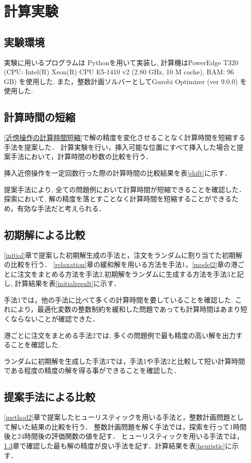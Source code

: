 \chapter{計算実験}\label{computational_result}
\section{実験環境}
実験に用いるプログラムは Pythonを用いて実装し, 計算機はPowerEdge T320 (CPU: Intel(R) Xeon(R) CPU E5-1410 v2 (2.80 GHz, 10 M cache), RAM: 96 GB) を使用した. また，整数計画ソルバーとしてGurobi Optimizer (ver 9.0.0) を使用した.

\section{計算時間の短縮}
\label{timecomparision}
\ref{近傍操作の計算時間短縮}で解の精度を変化させることなく計算時間を短縮する手法を提案した．
計算実験を行い，挿入可能な位置にすべて挿入した場合と提案手法において，計算時間の秒数の比較を行う．

挿入近傍操作を一定回数行った際の計算時間の比較結果を表\ref{shift}に示す．

提案手法により, 全ての問題例において計算時間が短縮できることを確認した．探索において, 解の精度を落とすことなく計算時間を短縮することができるため，有効な手法だと考えられる．

\section{初期解による比較}
\label{sectioninitial}
\ref{initial}章で提案した初期解生成の手法と，注文をランダムに割り当てた初期解の比較を行う．
\ref{relaxation}章の緩和解を用いる方法を手法1，\ref{model2}章の港ごとに注文をまとめる方法を手法2,初期解をランダムに生成する方法を手法3と記し, 計算結果を表\ref{initialresult}に示す．

手法1では，他の手法に比べて多くの計算時間を要していることを確認した. これにより，最適化変数の整数制約を緩和した問題であっても計算時間はあまり短くならないことが確認できた．

港ごとに注文をまとめる手法2では, 多くの問題例で最も精度の高い解を出力することを確認した.

ランダムに初期解を生成した手法3では，手法1や手法2と比較して短い計算時間である程度の精度の解を得る事ができることを確認した．


\section{提案手法による比較}
\ref{method2}章で提案したヒューリスティックを用いる手法と，整数計画問題として解いた結果の比較を行う．
整数計画問題を解く手法では，探索を行って1時間後と24時間後の評価関数の値を記す．
ヒューリスティックを用いる手法では，\ref{sectioninitial}章で確認した最も解の精度が良い手法を記す．計算結果を表\ref{heuristic}に示す．

